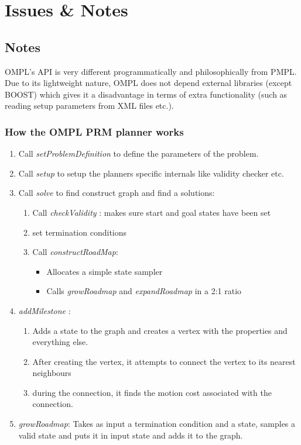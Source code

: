 \chapter{Issues \& Notes}

\section{Notes}

OMPL’s API is very different programmatically and philosophically from PMPL. Due to its lightweight nature, OMPL does not depend 
external libraries (except BOOST) which gives it a disadvantage in terms of extra functionality (such as reading setup parameters from XML files etc.).

\subsection{How the OMPL PRM planner works}
\begin{enumerate}
 \item Call \textit{setProblemDefinition} to define the parameters of the problem.
 \item Call \textit{setup} to setup the planners specific internals like validity checker etc.
 \item  Call \textit{solve} to find construct graph and find a solutions:
  \begin{enumerate}
    \item Call \textit{checkValidity} : makes sure start and goal states have been set
    \item set termination conditions
    \item Call \textit{constructRoadMap}: 
	    \begin{itemize}
	     \item Allocates a simple state sampler
	     \item Calls \textit{growRoadmap} and \textit{expandRoadmap} in a 2:1 ratio
	    \end{itemize}
  \end{enumerate}

 \item \textit{addMilestone} : 
  \begin{enumerate}
   \item  Adds a state to the graph and creates a vertex with the properties and everything else. 
   \item After creating the vertex, it attempts to connect the vertex to its nearest neighbours
   \item during the connection, it finds the motion cost associated with the connection. \color{red}{This is the point where we run the monte carlo simulation to generate edge costs}
  \end{enumerate}

 \item \textit{growRoadmap}: Takes as input a termination condition and a state, samples a valid state and puts it in input state and adds it to the graph.
\end{enumerate}

